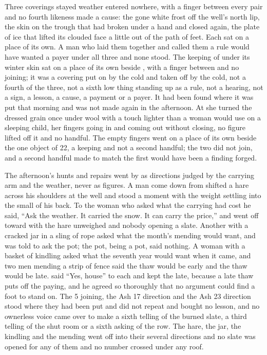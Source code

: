 Three coverings stayed weather entered nowhere, with a finger between every pair and no fourth likeness made a cause: the gone white frost off the well's north lip, the skin on the trough that had broken under a hand and closed again, the plate of ice that lifted its clouded face a little out of the path of feet. Each sat on a place of its own. A man who laid them together and called them a rule would have wanted a payer under all three and none stood. The keeping of  under its winter skin sat on a place of its own beside , with a finger between and no joining; it was a covering put on by the cold and taken off by the cold, not a fourth of the three, not a sixth low thing standing up as a rule, not a hearing, not a sign, a lesson, a cause, a payment or a payer. It had been found where it was put that morning and was not made again in the afternoon. At  she turned the dressed grain once under wool with a touch lighter than a woman would use on a sleeping child, her fingers going in and coming out without closing, no figure lifted off it and no handful. The empty fingers went on a place of its own beside the one object of  22, a keeping and not a second handful; the two did not join, and a second handful made to match the first would have been a finding forged.

\scenebreak

The afternoon's hunts and repairs went by as directions judged by the carrying arm and the weather, never as figures. A man come down from  shifted a hare across his shoulders at the well and stood a moment with the weight settling into the small of his back. To the woman who asked what the carrying had cost he said, “Ask the weather. It carried the snow. It can carry the price,” and went off toward  with the hare unweighed and nobody opening a slate. Another with a cracked jar in a sling of rope asked what the month's mending would want, and was told to ask the pot; the pot, being a pot, said nothing. A woman with a basket of kindling asked what the seventh year would want when it came, and two men mending a strip of fence said the thaw would be early and the thaw would be late.  said “Yes, house” to each and kept the late, because a late thaw puts off the paying, and he agreed so thoroughly that no argument could find a foot to stand on. The  5 joining, the Ash 17 direction and the Ash 23 direction stood where they had been put and did not repeat and bought no lesson, and no ownerless voice came over  to make a sixth telling of the burned slate, a third telling of the shut room or a sixth asking of the row. The hare, the jar, the kindling and the mending went off into their several directions and no slate was opened for any of them and no number crossed under any roof.

